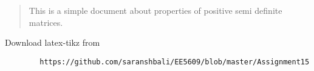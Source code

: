 \documentclass[journal,12pt,twocolumn]{IEEEtran}
\begin{document}
	\maketitle
	\newpage
	\bigskip
	\renewcommand{\thefigure}{\theenumi}
	\renewcommand{\thetable}{\theenumi}
	\begin{abstract}
	This is a simple document about properties of positive semi definite matrices.	
	\end{abstract}
	Download latex-tikz from
	\begin{lstlisting}
		https://github.com/saranshbali/EE5609/blob/master/Assignment15
	\end{lstlisting}
\end{document}
